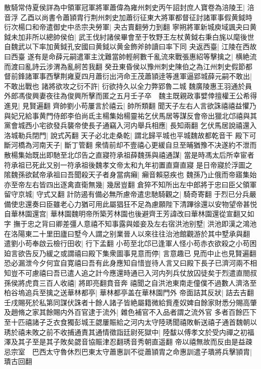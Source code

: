 散騎常侍夏侯詳為中領軍冠軍將軍蕭偉為雍州刺史丙午詔封庶人寶卷為涪陵王|{
	涪音浮}
乙酉以尚書令蕭頴胄行荆州刺史加蕭衍征東大將軍都督征討諸軍事假黄鉞時衍次楊口和帝遣御史中丞宗夬勞軍|{
	夬古賣翻勞力到翻}
寧朔將軍新城庾域諷夬曰黄鉞未加非所以總帥侯伯|{
	武王伐紂諸侯畢會至于牧野王左杖黄鉞右秉白旄以麾後世自魏武以下率加黄鉞孔安國曰黄鉞以黄金飾斧帥讀曰率下同}
夬返西臺|{
	江陵在西故曰西臺}
遂有是命薛元嗣遣軍主沈難當帥輕舸數千亂流來戰張惠紹等擊擒之|{
	横絶流而渡曰亂詩云涉渭為亂舸苦我翻}
癸丑東昏侯以豫州刺史陳伯之為江州刺史假節都督前鋒諸軍事西擊荆雍夏四月蕭衍出沔命王茂蕭頴逹等進軍逼郢城薛元嗣不敢出|{
	不敢出戰也}
諸將欲攻之衍不許|{
	衍欲持久以全力弊郢魯二城}
魏廣陵惠王羽通於員外郎馮俊興妻夜往為俊興所擊而匿之五月壬子卒　魏主既親政事嬖倖擅權王公希得進見|{
	見賢遍翻}
齊帥劉小苟屢言於禧云|{
	帥所類翻}
聞天子左右人言欲誅禧禧益懼乃與妃兄給事黄門侍郎李伯尚氐主楊集始楊靈祐乞伏馬居等謀反會帝出獵北邙禧與其黨會城西小宅欲發兵襲帝使長子通竊入河内舉兵相應|{
	長知兩翻}
乞伏馬居說禧還入洛城勒兵閉門|{
	說式芮翻}
天子必北走桑乾|{
	謂北歸平城也平城魏故都乾音干}
殿下可斷河橋為河南天子|{
	斷丁管翻}
衆情前却不壹禧心更緩自旦至晡猶豫不决遂約不泄而散楊集始既出即馳至北邙告之直寢符承祖薛魏孫與禧通謀|{
	當是時馮太后所幸宦者符承祖已死此又别一符承祖後魏孝文帝太和九年初置直齋直寢}
是日帝寢於浮圖之隂魏孫欲弑帝承祖曰吾聞殺天子者身當病癩|{
	癩音賴惡疾也}
魏孫乃止俄而帝寤集始亦至帝左右皆四出逐禽直衛無幾|{
	幾居豈翻}
倉猝不知所出左中郎將于忠曰臣父領軍留守京城|{
	守式又翻}
計防遏有備必無所慮帝遣忠馳騎觀之|{
	騎奇寄翻}
于烈已分兵嚴備使忠還奏曰臣雖老心力猶可用此屬猖狂不足為慮願陛下清蹕徐還以安物望帝甚悦自華林園還宫|{
	華林園魏明帝所築芳林園也後避齊王芳諱改曰華林園還從宣翻又如字}
撫于忠之背曰卿差彊人意禧不知事露與姬妾及左右宿洪池别墅|{
	洪池即漢之鴻池在洛陽東二十里田廬曰墅今人謂之别業晉人以來往往治池館觀游於其中墅承與翻}
遣劉小苟奉啟云檢行田收|{
	行下孟翻}
小苟至北邙已逢軍人怪小苟赤衣欲殺之小苟困廹言欲告反乃緩之或謂禧曰殿下集衆圖事見意而停|{
	言意趣已見而中止也見賢遍翻}
恐必漏泄今夕何宜自寛禧曰吾有此身應知自惜豈待人言又曰殿下長子已濟河兩不相知豈不可慮禧曰吾已遣人追之計今應還時通已入河内列兵仗放囚徒矣于烈遣直閤叔孫侯將虎賁三百人收禧|{
	將即亮翻賁音奔}
禧聞之自洪池東南走僮僕不過數人濟洛至柏谷塢追兵至擒之送華林都亭|{
	華林都亭盖在華林園門外}
帝面詰其反狀|{
	詰去吉翻}
壬戌賜死於私第同謀伏誅者十餘人諸子皆絶屬籍微給貲產奴婢自餘家財悉分賜高肇及趙脩之家其餘賜内外百官逮于流外|{
	雜色補官不入品者謂之流外官}
多者百餘匹下至十匹禧諸子乏衣食獨彭城王勰屢賑給之河内太守陸琇聞禧敗斬送禧子通首魏朝以琇於禧未敗之前不收捕通責其通情徵詣廷尉死獄中|{
	陸馛以傅孝文於受内禪之初福澤及其子至是其子敗矣勰音協賑津忍翻琇音秀朝直遥翻}
帝以禧無故而反由是益疎忌宗室　巴西太守魯休烈巴東太守蕭惠訓不從蕭頴胄之命惠訓遣子璝將兵擊頴胄|{
	璝古回翻}
